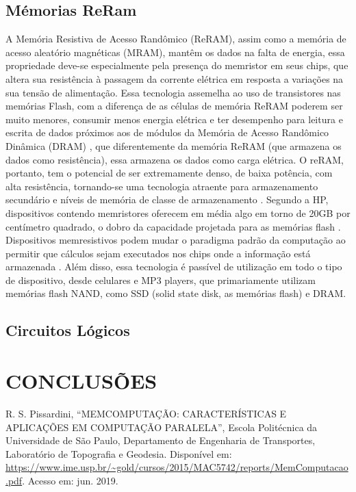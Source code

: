 \documentclass{ceel}
\begin{document}
\begin{multicols}{2}
\subsection{Mémorias ReRam}
A Memória Resistiva de Acesso Randômico (ReRAM), assim como a memória de acesso aleatório magnéticas (MRAM), mantêm os dados na falta de energia, essa propriedade deve-se especialmente pela presença do memristor em seus chips, que altera sua resistência à passagem da corrente elétrica em resposta a variações na sua tensão de alimentação.
Essa tecnologia assemelha ao uso de transistores nas memórias Flash, com a diferença de as células de memória ReRAM poderem ser muito menores, consumir menos energia elétrica e ter desempenho para leitura e escrita de dados próximos aos de módulos da Memória de Acesso Randômico Dinâmica (DRAM)\cite{blog} , que diferentemente da memória ReRAM (que armazena os dados como resistência), essa armazena os dados como carga elétrica.
O reRAM, portanto, tem o potencial de ser extremamente denso, de baixa potência, com alta resistência, tornando-se uma tecnologia atraente para armazenamento secundário e níveis de memória de classe de armazenamento \cite{prog}. Segundo a HP, dispositivos contendo memristores oferecem em média algo em torno de 20GB por centímetro quadrado, o dobro da capacidade projetada para as memórias flash \cite{hp}.
Dispositivos memresistivos podem mudar o paradigma padrão da computação ao permitir que cálculos sejam executados nos chips onde a informação está armazenada \cite{hp}. Além disso, essa tecnologia é passível de utilização em todo o tipo de dispositivo, desde celulares e MP3 players, que primariamente utilizam memórias flash NAND, como SSD (solid state disk, as memórias flash) e DRAM.

\subsection{Circuitos Lógicos}



\section{CONCLUSÕES}


\begin{thebibliography}{9}

    R. S. Pissardini,
    “MEMCOMPUTAÇÃO: CARACTERÍSTICAS E APLICAÇÕES EM
COMPUTAÇÃO PARALELA”, Escola Politécnica da Universidade de São Paulo, Departamento de Engenharia de Transportes, Laboratório de Topografia e Geodesia.
 Disponível em:
 \url{https://www.ime.usp.br/~gold/cursos/2015/MAC5742/reports/MemComputacao.pdf}. Acesso em: jun. 2019.


\end{thebibliography}
\end{multicols}
\end{document}
